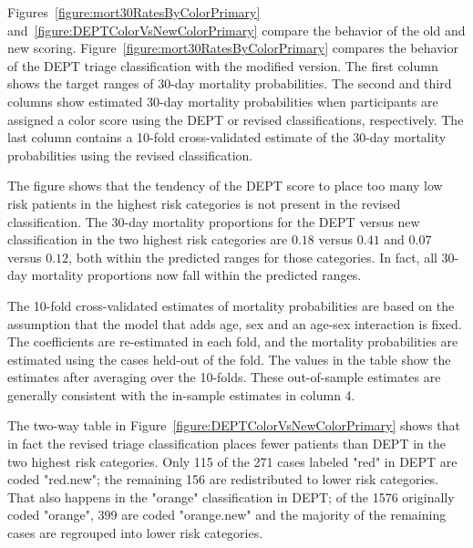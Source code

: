 Figures~\ref{figure:mort30RatesByColorPrimary} and~\ref{figure:DEPTColorVsNewColorPrimary} compare the behavior of the old and new scoring.   Figure~\ref{figure:mort30RatesByColorPrimary} compares the behavior of the DEPT triage classification with the modified version.  The first column shows the target ranges of 30-day mortality probabilities.  The second and third columns show estimated 30-day mortality probabilities when participants are assigned a color score using the DEPT or revised classifications, respectively.  The last column contains a 10-fold cross-validated estimate of the 30-day mortality probabilities using the revised classification. 

The figure shows that the tendency of the DEPT score to place too many low risk patients in the highest risk categories is not present in the revised classification.  The 30-day mortality proportions for the DEPT versus new classification in the two highest risk categories are $0.18$ versus $0.41$ and $0.07$ versus $0.12$, both within the predicted ranges for those categories.  In fact, all 30-day mortality proportions now fall within the predicted ranges.

 The 10-fold cross-validated estimates of mortality probabilities are based on the assumption that the model that adds age, sex and an age-sex interaction is fixed.  The coefficients are re-estimated in each fold, and the mortality probabilities are estimated using the cases held-out of the fold.  The values in the table show the estimates after averaging over the 10-folds.  These out-of-sample estimates are generally consistent with the in-sample estimates in column 4.

The two-way table in Figure~\ref{figure:DEPTColorVsNewColorPrimary} shows that in fact the revised triage classification places fewer patients than DEPT in the two highest risk categories.  Only 115 of the 271 cases labeled "red" in DEPT are coded "red.new"; the remaining 156 are redistributed to lower risk categories.  That also happens in the "orange" classification in DEPT; of the 1576 originally coded "orange", 399 are coded "orange.new" and the majority of the remaining cases are regrouped into lower risk categories.



